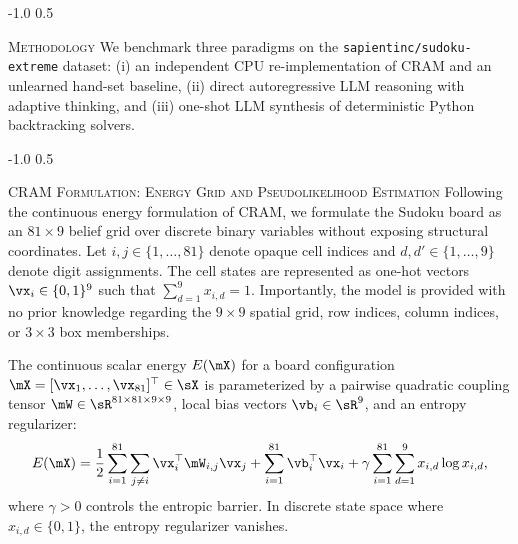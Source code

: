 \documentclass{article} %
\makeatletter
\renewcommand{\section}{\@startsection{section}{1}{\z@}%
  {-1.0\baselineskip}%
  {0.5\baselineskip}%
  {\normalfont\fontsize{12}{14}\selectfont\raggedright\scshape}}
\renewcommand{\subsection}{\@startsection{subsection}{2}{\z@}%
  {-1.0\baselineskip}%
  {0.5\baselineskip}%
  {\normalfont\fontsize{10}{11}\selectfont\raggedright\scshape}}
\makeatother
\begin{document}
\section{\textsc{Methodology}}
\label{sec:method}
We benchmark three paradigms on the \texttt{sapientinc/sudoku-extreme} dataset: (i) an independent CPU re-implementation of CRAM and an unlearned hand-set baseline, (ii) direct autoregressive LLM reasoning with adaptive thinking, and (iii) one-shot LLM synthesis of deterministic Python backtracking solvers.

\subsection{\textsc{CRAM Formulation: Energy Grid and Pseudolikelihood Estimation}}
\label{sec:cram_formulation}
Following the continuous energy formulation of CRAM, we formulate the Sudoku board as an $81 \times 9$ belief grid over discrete binary variables without exposing structural coordinates. Let $i, j \in \{1, \dots, 81\}$ denote opaque cell indices and $d, d' \in \{1, \dots, 9\}$ denote digit assignments. The cell states are represented as one-hot vectors $\vx_i \in \{0, 1\}^9$ such that $\sum_{d=1}^9 x_{i,d} = 1$. Importantly, the model is provided with no prior knowledge regarding the $9 \times 9$ spatial grid, row indices, column indices, or $3 \times 3$ box memberships.

The continuous scalar energy $E(\mX)$ for a board configuration $\mX = [\vx_1, \dots, \vx_{81}]^\top \in \sX$ is parameterized by a pairwise quadratic coupling tensor $\mW \in \sR^{81 \times 81 \times 9 \times 9}$, local bias vectors $\vb_i \in \sR^9$, and an entropy regularizer:
\begin{equation}
E(\mX) = \frac{1}{2} \sum_{i=1}^{81} \sum_{j \neq i} \vx_i^\top \mW_{i,j} \vx_j + \sum_{i=1}^{81} \vb_i^\top \vx_i + \gamma \sum_{i=1}^{81} \sum_{d=1}^9 x_{i,d} \log x_{i,d},
\label{eq:energy_function}
\end{equation}
where $\gamma > 0$ controls the entropic barrier. In discrete state space where $x_{i,d} \in \{0, 1\}$, the entropy regularizer vanishes.
\end{document}
